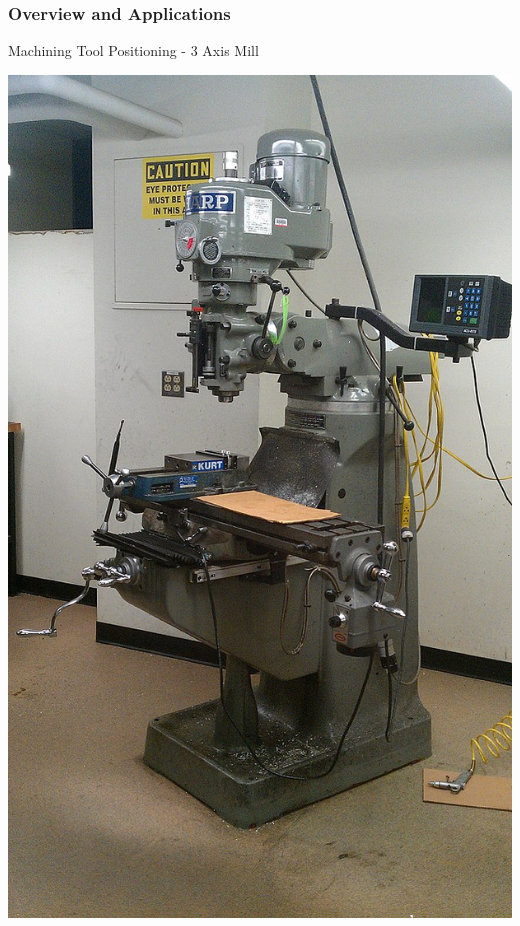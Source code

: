 \documentclass[fleqn]{beamer} %
\newcommand{\sectiontitleI}{Overview and Applications}
\begin{document}
\begin{frame}[label=sectionI]
\begin{multicols}{2}
		\end{multicols}

	\end{frame}

	\begin{frame}[label=sectionI] \small
		\frametitle{\sectiontitleI}	
		Machining Tool Positioning - 3 Axis Mill

		\begin{multicols}{2}
			\includegraphics[scale=0.15]{images/Sharp_3_Axis_Vertical_Mill_Full_View.jpeg}


\end{multicols}
\end{frame}
\end{document}
